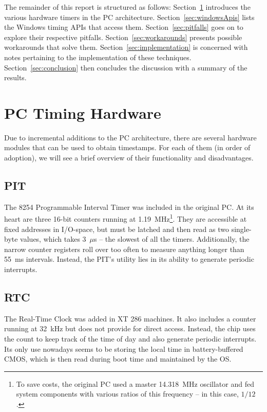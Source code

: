 \documentclass[a4paper,12pt,pdftex]{article}
\begin{document}
The remainder of this report is structured as follows: Section~\ref{sec:timingHardware} introduces the various hardware timers in the PC architecture. Section~\ref{sec:windowsApis} lists the Windows timing APIs that access them. Section~\ref{sec:pitfalls} goes on to explore their respective pitfalls. Section~\ref{sec:workarounds} presents possible workarounds that solve them. Section~\ref{sec:implementation} is concerned with notes pertaining to the implementation of these techniques. Section~\ref{sec:conclusion} then concludes the discussion with a summary of the results.


\section{PC Timing Hardware}
\label{sec:timingHardware}

Due to incremental additions to the PC architecture, there are several hardware modules that can be used to obtain timestamps. For each of them (in order of adoption), we will see a brief overview of their functionality and disadvantages.

\subsection{PIT}

The 8254 Programmable Interval Timer was included in the original PC. At its heart are three 16-bit counters running at 1.19~MHz\footnote{To save costs, the original PC used a master 14.318~MHz oscillator and fed system components with various ratios of this frequency -- in this case, $1/12$.}. They are accessible at fixed addresses in I/O-space, but must be latched and then read as two single-byte values, which takes 3~$\mu$s -- the slowest of all the timers. Additionally, the narrow counter registers roll over too often to measure anything longer than 55~ms intervals. Instead, the PIT's utility lies in its ability to generate periodic interrupts.

\subsection{RTC}

The Real-Time Clock was added in XT 286 machines. It also includes a counter running at 32~kHz but does not provide for direct access. Instead, the chip uses the count to keep track of the time of day and also generate periodic interrupts. Its only use nowadays seems to be storing the local time in battery-buffered CMOS, which is then read during boot time and maintained by the OS.
\end{document}
